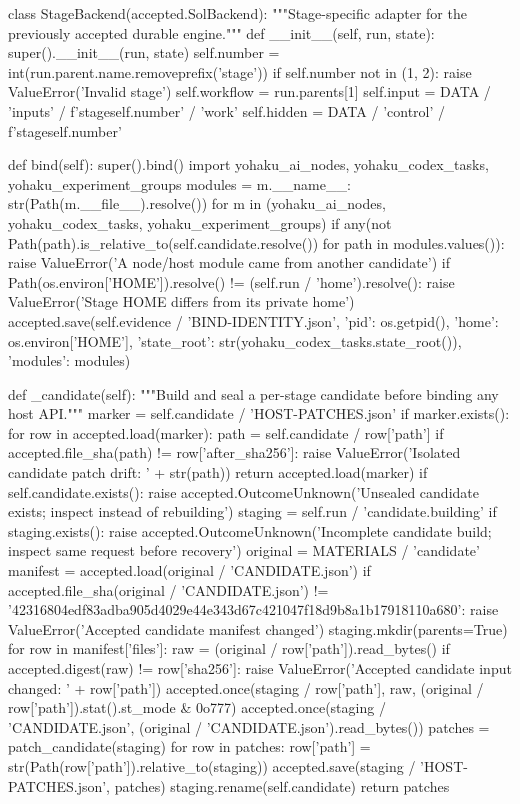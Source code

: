 class StageBackend(accepted.SolBackend):
    """Stage-specific adapter for the previously accepted durable engine."""
    def __init__(self, run, state):
        super().__init__(run, state)
        self.number = int(run.parent.name.removeprefix('stage'))
        if self.number not in (1, 2):
            raise ValueError('Invalid stage')
        self.workflow = run.parents[1]
        self.input = DATA / 'inputs' / f'stage{self.number}' / 'work'
        self.hidden = DATA / 'control' / f'stage{self.number}'

    def bind(self):
        super().bind()
        import yohaku_ai_nodes, yohaku_codex_tasks, yohaku_experiment_groups
        modules = {m.__name__: str(Path(m.__file__).resolve())
                   for m in (yohaku_ai_nodes, yohaku_codex_tasks, yohaku_experiment_groups)}
        if any(not Path(path).is_relative_to(self.candidate.resolve()) for path in modules.values()):
            raise ValueError('A node/host module came from another candidate')
        if Path(os.environ['HOME']).resolve() != (self.run / 'home').resolve():
            raise ValueError('Stage HOME differs from its private home')
        accepted.save(self.evidence / 'BIND-IDENTITY.json', {'pid': os.getpid(), 'home': os.environ['HOME'],
            'state_root': str(yohaku_codex_tasks.state_root()), 'modules': modules})

    def _candidate(self):
        """Build and seal a per-stage candidate before binding any host API."""
        marker = self.candidate / 'HOST-PATCHES.json'
        if marker.exists():
            for row in accepted.load(marker):
                path = self.candidate / row['path']
                if accepted.file_sha(path) != row['after_sha256']:
                    raise ValueError('Isolated candidate patch drift: ' + str(path))
            return accepted.load(marker)
        if self.candidate.exists():
            raise accepted.OutcomeUnknown('Unsealed candidate exists; inspect instead of rebuilding')
        staging = self.run / 'candidate.building'
        if staging.exists():
            raise accepted.OutcomeUnknown('Incomplete candidate build; inspect same request before recovery')
        original = MATERIALS / 'candidate'
        manifest = accepted.load(original / 'CANDIDATE.json')
        if accepted.file_sha(original / 'CANDIDATE.json') != '42316804edf83adba905d4029e44e343d67c421047f18d9b8a1b17918110a680':
            raise ValueError('Accepted candidate manifest changed')
        staging.mkdir(parents=True)
        for row in manifest['files']:
            raw = (original / row['path']).read_bytes()
            if accepted.digest(raw) != row['sha256']:
                raise ValueError('Accepted candidate input changed: ' + row['path'])
            accepted.once(staging / row['path'], raw, (original / row['path']).stat().st_mode & 0o777)
        accepted.once(staging / 'CANDIDATE.json', (original / 'CANDIDATE.json').read_bytes())
        patches = patch_candidate(staging)
        for row in patches:
            row['path'] = str(Path(row['path']).relative_to(staging))
        accepted.save(staging / 'HOST-PATCHES.json', patches)
        staging.rename(self.candidate)
        return patches

